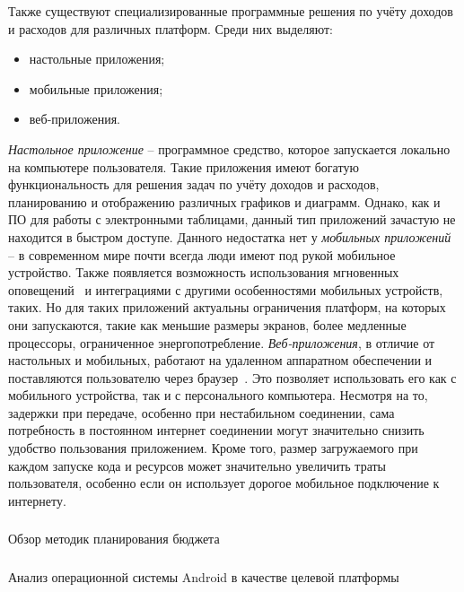 Также существуют специализированные программные решения по учёту доходов и расходов для различных платформ.
Среди них выделяют:
\begin{itemize}
    \item настольные приложения;
    \item мобильные приложения;
    \item веб-приложения.
\end{itemize}

\emph{Настольное приложение} -- программное средство, которое запускается локально на компьютере пользователя.
Такие приложения имеют богатую функциональность для решения задач по учёту доходов и расходов, планированию и отображению различных графиков и диаграмм.
Однако, как и ПО для работы с электронными таблицами, данный тип приложений зачастую не находится в быстром доступе.
Данного недостатка нет у \emph{мобильных приложений} -- в современном мире почти всегда люди имеют под рукой мобильное устройство.
Также появляется возможность использования мгновенных оповещений~\cite{desktop_mobile_differences} и интеграциями с другими особенностями мобильных устройств, таких.
Но для таких приложений актуальны ограничения платформ, на которых они запускаются, такие как меньшие размеры экранов, более медленные процессоры, ограниченное энергопотребление.
\emph{Веб-приложения}, в отличие от настольных и мобильных, работают на удаленном аппаратном обеспечении и поставляются пользователю через браузер~\cite{web_based_vs_desktop}.
Это позволяет использовать его как с мобильного устройства, так и с персонального компьютера.
Несмотря на то, задержки при передаче, особенно при нестабильном соединении, сама потребность в постоянном интернет соединении могут значительно снизить удобство пользования приложением.
Кроме того, размер загружаемого при каждом запуске кода и ресурсов может значительно увеличить траты пользователя, особенно если он использует дорогое мобильное подключение к интернету.

\subsubsection{} Обзор методик планирования бюджета
\label{sec:analysis:literature:optimization}


\subsubsection{} Анализ операционной системы Android в качестве целевой платформы
\label{sec:analysis:literature:android}

